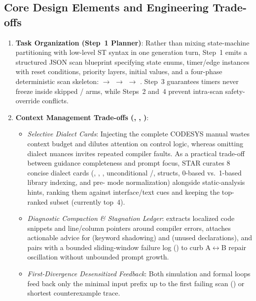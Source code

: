 \subsection{Core Design Elements and Engineering Trade-offs}
\begin{enumerate}
  \item \textbf{Task Organization (Step~1 Planner)}: Rather than mixing state-machine partitioning with low-level ST syntax in one generation turn, Step~1 emits a structured JSON scan blueprint specifying state enums, timer/edge instances with reset conditions, priority layers, initial values, and a four-phase deterministic scan skeleton:  $\rightarrow$  $\rightarrow$  $\rightarrow$ . Step~3 guarantees timers never freeze inside skipped / arms, while Steps~2 and~4 prevent intra-scan safety-override conflicts.
  \item \textbf{Context Management Trade-offs (, , )}:
    \begin{itemize}
      \item \emph{Selective Dialect Cards}: Injecting the complete CODESYS manual wastes context budget and dilutes attention on control logic, whereas omitting dialect nuances invites repeated compiler faults. As a practical trade-off between guidance completeness and prompt focus, STAR curates 8 concise dialect cards (, , , unconditional /,  structs, 0-based  vs.\ 1-based  library indexing, and pre- mode normalization) alongside static-analysis hints, ranking them against interface/text cues and keeping the top-ranked subset (currently top~4).
      \item \emph{Diagnostic Compaction \& Stagnation Ledger}:  extracts localized code snippets and line/column pointers around compiler errors, attaches actionable advice for  (keyword shadowing) and  (unused declarations), and pairs with a bounded sliding-window failure log () to curb A$\leftrightarrow$B repair oscillation without unbounded prompt growth.
      \item \emph{First-Divergence Desensitized Feedback}: Both simulation and formal loops feed back only the minimal input prefix up to the first failing scan () or shortest counterexample trace.

\end{itemize}
\end{enumerate}
